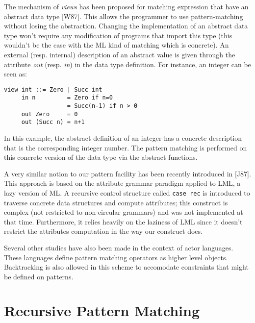 \begin{sloppypar}
The mechanism of {\em views} has been proposed for matching expression
that have an abstract data type [W87]. This allows the programmer to
use pattern-matching without losing the abstraction. Changing the
implementation of an abstract data type won't require any modification
of programs that import this type (this wouldn't be the case with the
ML kind of matching which is concrete).  An external (resp.  internal)
description of an abstract value is given through the attribute {\em
out} (resp. {\em in}) in the data type definition.  For instance, an
integer can be seen as:
\begin{verbatim}
view int ::= Zero | Succ int
     in n         = Zero if n=0
                  = Succ(n-1) if n > 0
     out Zero     = 0
     out (Succ n) = n+1
\end{verbatim}
In this example, the abstract definition of an integer has a
concrete description that is the corresponding integer number. The
pattern matching is performed on this concrete version of the data
type via the abstract functions.

A very similar notion to our pattern facility has been recently
introduced in [J87]. This approach is based on the attribute grammar
paradigm applied to LML, a lazy version of ML. A recursive control
structure called {\tt case rec} is introduced to traverse concrete
data structures and compute attributes; this construct is complex (not
restricted to non-circular grammars) and was not implemented at that
time. Furthermore, it relies heavily on the laziness of LML since it
doesn't restrict the attributes computation in the way our construct
does.

Several other studies have also been made in the context of actor
languages. These languages define pattern matching operators as higher
level objects. Backtracking is also allowed in this scheme to accomodate
constraints that might be defined on patterns. 

\section{Recursive Pattern Matching}


\end{sloppypar}
